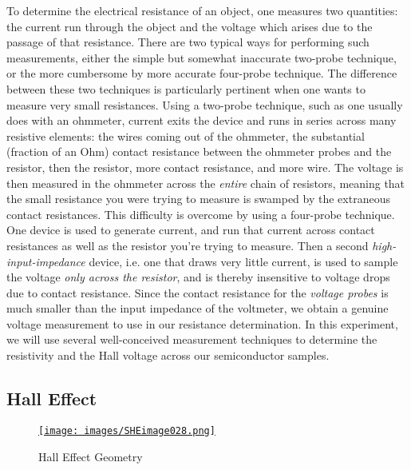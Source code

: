 \documentclass{../lab}
\begin{document}
To determine the electrical resistance of an object, one measures two quantities: the current run through the object and the voltage which arises due to the passage of that resistance. There are two typical ways for performing such measurements, either the simple but somewhat inaccurate two-probe technique, or the more cumbersome by more accurate four-probe technique. The difference between these two techniques is particularly pertinent when one wants to measure very small resistances. Using a two-probe technique, such as one usually does with an ohmmeter, current exits the device and runs in series across many resistive elements: the wires coming out of the ohmmeter, the substantial (fraction of an Ohm) contact resistance between the ohmmeter probes and the resistor, then the resistor, more contact resistance, and more wire. The voltage is then measured in the ohmmeter across the \emph{entire} chain of resistors, meaning that the small resistance you were trying to measure is swamped by the extraneous contact resistances. This difficulty is overcome by using a four-probe technique. One device is used to generate current, and run that current across contact resistances as well as the resistor you're trying to measure. Then a second \emph{high-input-impedance} device, i.e. one that draws very little current, is used to sample the voltage \emph{only across the resistor}, and is thereby insensitive to voltage drops due to contact resistance. Since the contact resistance for the \emph{voltage probes} is much smaller than the input impedance of the voltmeter, we obtain a genuine voltage measurement to use in our resistance determination. In this experiment, we will use several well-conceived measurement techniques to determine the resistivity and the Hall voltage across our semiconductor samples.

\subsection{Hall Effect}

\begin{figure}[h]
    \centering
    \href{http://experimentationlab.berkeley.edu/sites/default/files/images/SHEimage028.gif}{\texttt{[image: images/SHEimage028.png]}}
    \caption{Hall Effect Geometry}
    \label{fig:HallEffectGeometry}
\end{figure}
\end{document}
